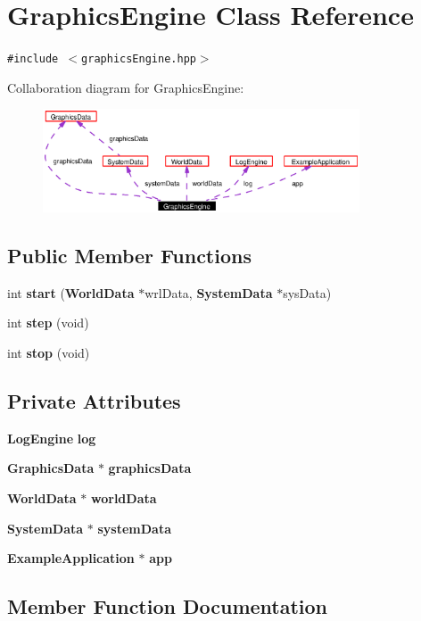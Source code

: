 \section{Graphics\-Engine Class Reference}
\label{classGraphicsEngine}
{\tt \#include $<$graphics\-Engine.hpp$>$}

Collaboration diagram for Graphics\-Engine:\begin{figure}[H]
\begin{center}
\leavevmode
\includegraphics[width=266pt]{classGraphicsEngine__coll__graph}
\end{center}
\end{figure}
\subsection*{Public Member Functions}
\begin{CompactItemize}
\item 
int {\bf start} ({\bf World\-Data} $\ast$wrl\-Data, {\bf System\-Data} $\ast$sys\-Data)
\item 
int {\bf step} (void)
\item 
int {\bf stop} (void)
\end{CompactItemize}
\subsection*{Private Attributes}
\begin{CompactItemize}
\item 
{\bf Log\-Engine} {\bf log}
\item 
{\bf Graphics\-Data} $\ast$ {\bf graphics\-Data}
\item 
{\bf World\-Data} $\ast$ {\bf world\-Data}
\item 
{\bf System\-Data} $\ast$ {\bf system\-Data}
\item 
{\bf Example\-Application} $\ast$ {\bf app}
\end{CompactItemize}


\subsection{Member Function Documentation}
